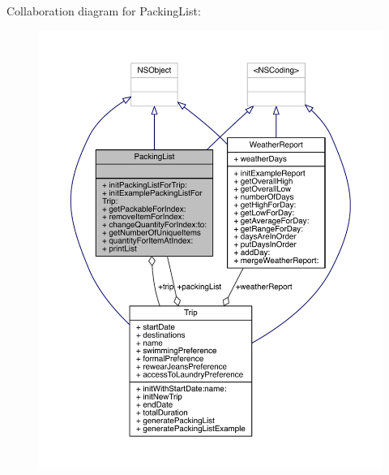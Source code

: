 Collaboration diagram for Packing\-List\-:
\nopagebreak
\begin{figure}[H]
\begin{center}
\leavevmode
\includegraphics[width=350pt]{interface_packing_list__coll__graph}
\end{center}
\end{figure}
